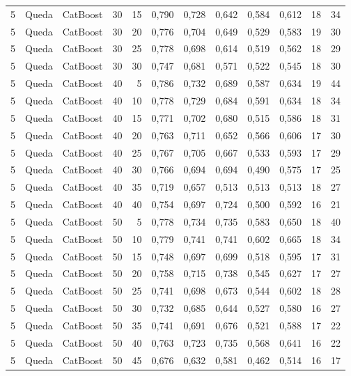 \begin{longtable}{@{}rllrrrrrrrrr@{}}
5 & Queda & CatBoost & 30 & 15 & 0,790 & 0,728 & 0,642 & 0,584 & 0,612 & 18 & 34 \\
5 & Queda & CatBoost & 30 & 20 & 0,776 & 0,704 & 0,649 & 0,529 & 0,583 & 19 & 30 \\
5 & Queda & CatBoost & 30 & 25 & 0,778 & 0,698 & 0,614 & 0,519 & 0,562 & 18 & 29 \\
5 & Queda & CatBoost & 30 & 30 & 0,747 & 0,681 & 0,571 & 0,522 & 0,545 & 18 & 30 \\
5 & Queda & CatBoost & 40 & 5 & 0,786 & 0,732 & 0,689 & 0,587 & 0,634 & 19 & 44 \\
5 & Queda & CatBoost & 40 & 10 & 0,778 & 0,729 & 0,684 & 0,591 & 0,634 & 18 & 34 \\
5 & Queda & CatBoost & 40 & 15 & 0,771 & 0,702 & 0,680 & 0,515 & 0,586 & 18 & 31 \\
5 & Queda & CatBoost & 40 & 20 & 0,763 & 0,711 & 0,652 & 0,566 & 0,606 & 17 & 30 \\
5 & Queda & CatBoost & 40 & 25 & 0,767 & 0,705 & 0,667 & 0,533 & 0,593 & 17 & 29 \\
5 & Queda & CatBoost & 40 & 30 & 0,766 & 0,694 & 0,694 & 0,490 & 0,575 & 17 & 25 \\
5 & Queda & CatBoost & 40 & 35 & 0,719 & 0,657 & 0,513 & 0,513 & 0,513 & 18 & 27 \\
5 & Queda & CatBoost & 40 & 40 & 0,754 & 0,697 & 0,724 & 0,500 & 0,592 & 16 & 21 \\
5 & Queda & CatBoost & 50 & 5 & 0,778 & 0,734 & 0,735 & 0,583 & 0,650 & 18 & 40 \\
5 & Queda & CatBoost & 50 & 10 & 0,779 & 0,741 & 0,741 & 0,602 & 0,665 & 18 & 34 \\
5 & Queda & CatBoost & 50 & 15 & 0,748 & 0,697 & 0,699 & 0,518 & 0,595 & 17 & 31 \\
5 & Queda & CatBoost & 50 & 20 & 0,758 & 0,715 & 0,738 & 0,545 & 0,627 & 17 & 27 \\
5 & Queda & CatBoost & 50 & 25 & 0,741 & 0,698 & 0,673 & 0,544 & 0,602 & 18 & 28 \\
5 & Queda & CatBoost & 50 & 30 & 0,732 & 0,685 & 0,644 & 0,527 & 0,580 & 16 & 27 \\
5 & Queda & CatBoost & 50 & 35 & 0,741 & 0,691 & 0,676 & 0,521 & 0,588 & 17 & 22 \\
5 & Queda & CatBoost & 50 & 40 & 0,763 & 0,723 & 0,735 & 0,568 & 0,641 & 16 & 22 \\
5 & Queda & CatBoost & 50 & 45 & 0,676 & 0,632 & 0,581 & 0,462 & 0,514 & 16 & 17 \\

\end{longtable}

